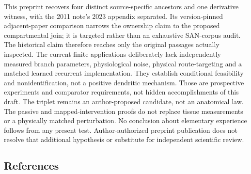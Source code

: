 \documentclass[
  american,
  11pt,
  letterpaper,
]{article}
\begin{document}
This preprint recovers four distinct source-specific ancestors and one derivative witness, with the 2011 note's 2023 appendix separated. Its version-pinned adjacent-paper comparison narrows the ownership claim to the proposed compartmental join; it is targeted rather than an exhaustive SAN-corpus audit. The historical claim therefore reaches only the original passages actually inspected. The current finite applications deliberately lack independently measured branch parameters, physiological noise, physical route-targeting and a matched learned recurrent implementation. They establish conditional feasibility and nonidentification, not a positive dendritic mechanism. Those are prospective experiments and comparator requirements, not hidden accomplishments of this draft. The triplet remains an author-proposed candidate, not an anatomical law. The passive and mapped-intervention proofs do not replace tissue measurements or a physically matched perturbation. No conclusion about elementary experience follows from any present test. Author-authorized preprint publication does not resolve that additional hypothesis or substitute for independent scientific review.

\subsection{References}\label{references}
\end{document}

